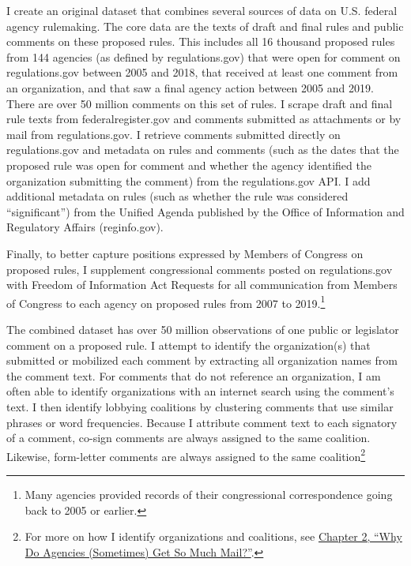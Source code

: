 \documentclass[
      12pt,
        ]{article}
\begin{document}
I create an original dataset that combines several sources of data on U.S. federal agency rulemaking.
The core data are the texts of draft and final rules and public comments on these proposed rules.
This includes all 16 thousand proposed rules from 144 agencies (as defined by regulations.gov) that were open for comment on regulations.gov between 2005 and 2018, that received at least one comment from an organization, and that saw a final agency action between 2005 and 2019.
There are over 50 million comments on this set of rules.
I scrape draft and final rule texts from federalregister.gov and comments submitted as attachments or by mail from regulations.gov.
I retrieve comments submitted directly on regulations.gov and metadata on rules and comments (such as the dates that the proposed rule was open for comment and whether the agency identified the organization submitting the comment) from the regulations.gov API.
I add additional metadata on rules (such as whether the rule was considered ``significant'') from the Unified Agenda published by the Office of Information and Regulatory Affairs (reginfo.gov).

Finally, to better capture positions expressed by Members of Congress on proposed rules, I supplement congressional comments posted on regulations.gov with Freedom of Information Act Requests for all communication from Members of Congress to each agency on proposed rules from 2007 to 2019.\footnote{Many agencies provided records of their congressional correspondence going back to 2005 or earlier.}

The combined dataset has over 50 million observations of one public or legislator comment on a proposed rule. I attempt to identify the organization(s) that submitted or mobilized each comment by extracting all organization names from the comment text. For comments that do not reference an organization, I am often able to identify organizations with an internet search using the comment's text. I then identify lobbying coalitions by clustering comments that use similar phrases or word frequencies. Because I attribute comment text to each signatory of a comment, co-sign comments are always assigned to the same coalition. Likewise, form-letter comments are always assigned to the same coalition\footnote{For more on how I identify organizations and coalitions, see \href{https://judgelord.github.io/dissertation/whyMail.pdf}{Chapter 2, ``Why Do Agencies (Sometimes) Get So Much Mail?''}.}
\end{document}
